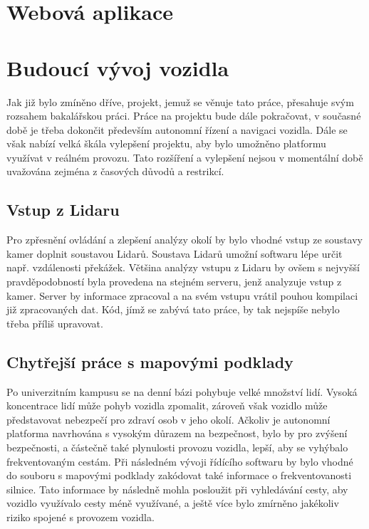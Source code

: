 \documentclass[czech, bachelor]{diploma}
\begin{document}

\chapter{Webová aplikace}


\chapter{Budoucí vývoj vozidla}

Jak již bylo zmíněno dříve, projekt, jemuž se věnuje tato práce, přesahuje svým rozsahem bakalářskou práci. Práce na projektu bude
dále pokračovat, v současné době je třeba dokončit především autonomní řízení a navigaci vozidla. Dále se však nabízí velká škála
vylepšení projektu, aby bylo umožněno platformu využívat v reálném provozu. Tato rozšíření a vylepšení nejsou v momentální době
uvažována zejména z časových důvodů a restrikcí.

\section{Vstup z Lidaru}

Pro zpřesnění ovládání a zlepšení analýzy okolí by bylo vhodné vstup ze soustavy kamer doplnit soustavou Lidarů. Soustava Lidarů
umožní softwaru lépe určit např. vzdálenosti překážek. Většina analýzy vstupu z Lidaru by ovšem s nejvyšší pravděpodobností byla
provedena na stejném serveru, jenž analyzuje vstup z kamer. Server by informace zpracoval a na svém vstupu vrátil pouhou kompilaci
již zpracovaných dat. Kód, jímž se zabývá tato práce, by tak nejspíše nebylo třeba příliš upravovat.

\section{Chytřejší práce s mapovými podklady} \label{smarter-maps}

Po univerzitním kampusu se na denní bázi pohybuje velké množství lidí. Vysoká koncentrace lidí může pohyb vozidla zpomalit,
zároveň však vozidlo může představovat nebezpečí pro zdraví osob v jeho okolí. Ačkoliv je autonomní platforma navrhována s vysokým
důrazem na bezpečnost, bylo by pro zvýšení bezpečnosti, a částečně také plynulosti provozu vozidla, lepší, aby se vyhýbalo
frekventovaným cestám. Při následném vývoji řídícího softwaru by bylo vhodné do souboru s mapovými podklady zakódovat také
informace o frekventovanosti silnice. Tato informace by následně mohla posloužit při vyhledávání cesty, aby vozidlo využívalo
cesty méně využívané, a ještě více bylo zmírněno jakékoliv riziko spojené s provozem vozidla.
\end{document}
